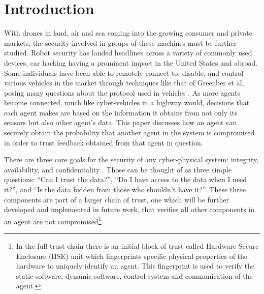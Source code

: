 \documentclass[conference]{IEEEtran}
\begin{document}


%
\IEEEpeerreviewmaketitle

\section{Introduction}
With drones in land, air and sea coming into the growing consumer and private markets, the security involved in groups of these machines must be further studied. Robot security has landed headlines across a variety of commonly used devices, car hacking having a prominent impact in the United States and abroad. Some individuals have been able to remotely connect to, disable, and control various vehicles in the market through techniques like that of Greenber et al, posing many questions about the protocol used in vehicles \cite{greenberg2015hackers}. As more agents become connected, much like cyber-vehicles in a highway would, decisions that each agent makes are based on the information it obtains from not only its sensors but also other agent's data. This paper discusses how an agent can securely obtain the probability that another agent in the system is compromised in order to trust feedback obtained from that agent in question.

There are three core goals for the security of any cyber-physical system: integrity, availability, and confidentiality \cite{Cardenas2008}. Those can be thought of as three simple questions: ``Can I trust the data?'', ``Do I have access to the data when I need it?'', and ``Is the data hidden from those who shouldn't have it?''. These three components are part of a larger chain of trust, one which will be further developed and implemented in future work, that verifies all other components in an agent are not compromised\footnote{In the full trust chain there is an initial block of trust called Hardware Secure Enclosure (HSE) unit which fingerprints specific physical properties of the hardware to uniquely identify an agent. This fingerprint is used to verify the static software, dynamic software, control system and communication of the agent.}.
\end{document}
